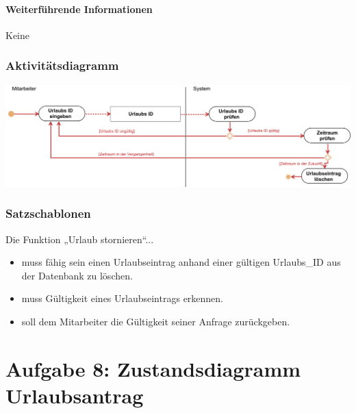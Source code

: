 \subsubsection{Weiterführende Informationen}
Keine

\subsection{Aktivitätsdiagramm}

\begin{center}
\includegraphics[width=0.9\linewidth]{Urlaub_stornieren.png}
\end{center}

\subsection{Satzschablonen}
Die Funktion „Urlaub stornieren“...
\begin{itemize}
    \item muss fähig sein einen Urlaubseintrag anhand einer gültigen Urlaubs\_ID aus der Datenbank zu löschen.
    \item muss Gültigkeit eines Urlaubseintrags erkennen.
    \item soll dem Mitarbeiter die Gültigkeit seiner Anfrage zurückgeben.
\end{itemize}

\chapter*{Aufgabe 8: Zustandsdiagramm Urlaubsantrag}
\setcounter{section}{0}
\addtocounter{chapter}{1}

